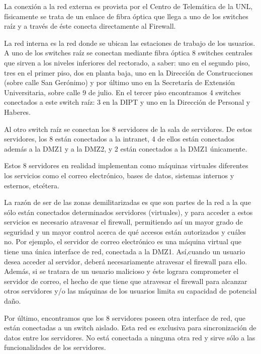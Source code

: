 \documentclass[a4paper,11pt,oneside]{article}
\begin{document}
La conexión a la red externa es provista por el Centro de Telemática
de la UNL, físicamente se trata de un enlace de fibra óptica que llega
a uno de los switches raíz y a través de éste conecta directamente al
Firewall.

La red interna es la red donde se ubican las estaciones de trabajo de
los usuarios.  A uno de los switches raíz se conectan mediante fibra
óptica 8 switches centrales que sirven a los niveles inferiores del
rectorado, a saber: uno en el segundo piso, tres en el primer piso,
dos en planta baja, uno en la Dirección de Construcciones (sobre calle
San Gerónimo) y por último uno en la Secretaría de Extensión
Universitaria, sobre calle 9 de julio. En el tercer piso encontramos 4
switches conectados a este switch raíz: 3 en la DIPT y uno en la
Dirección de Personal y Haberes.

Al otro switch raíz se conectan los 8 servidores de la sala de
servidores.  De estos servidores, los 8 están conectados a la
intranet, 4 de ellos están conectados además a la DMZ1 y a la DMZ2, y
2 están conectados a la DMZ1 únicamente.

Estos 8 servidores en realidad implementan como máquinas virtuales
diferentes los servicios como el correo electrónico, bases de datos,
sistemas internos y esternos, etcétera.

La razón de ser de las zonas demilitarizadas es que son partes de la
red a la que sólo están conectados determinados servidores
(virtuales), y para acceder a estos servicios es necesario atravesar
el firewall, permitiendo así un mayor grado de seguridad y un mayor
control acerca de qué accesos están autorizados y cuáles no. Por
ejemplo, el servidor de correo electrónico es una máquina virtual que
tiene una única interface de red, conectada a la DMZ1. Así,cuando un
usuario desea acceder al servidor, deberá necesariamente atravesar el
firewall para ello. Además, si se tratara de un usuario malicioso y
éste lograra comprometer el servidor de correo, el hecho de que tiene
que atravesar el firewall para alcanzar otros servidores y/o las
máquinas de los usuarios limita su capacidad de potencial daño.

Por último, encontramos que los 8 servidores poseen otra interface de
red, que están conectadas a un switch aislado. Esta red es exclusiva
para sincronización de datos entre los servidores. No está conectada a
ninguna otra red y sirve sólo a las funcionalidades de los servidores.
\end{document}

